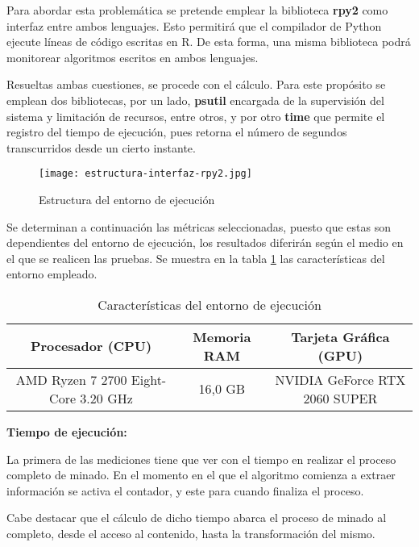 Para abordar esta problemática se pretende emplear la biblioteca \textbf{rpy2} \cite{rpy2} como interfaz 
entre ambos lenguajes. Esto permitirá que el compilador de Python ejecute líneas de código escritas en R. 
De esta forma, una misma biblioteca podrá monitorear algoritmos escritos en ambos lenguajes.

Resueltas ambas cuestiones, se procede con el cálculo. Para este propósito se emplean dos bibliotecas, por
un lado, \textbf{psutil} \cite{psutil} encargada de la supervisión del sistema y limitación de recursos, 
entre otros, y por otro \textbf{time} que permite el registro del tiempo de ejecución, pues retorna el 
número de segundos transcurridos desde un cierto instante.

\begin{figure}[tphb]
  \centering
  \texttt{[image: estructura-interfaz-rpy2.jpg]}
  \caption{Estructura del entorno de ejecución}
  \label{img:estructura del entorno de ejecucion}
\end{figure}

Se determinan a continuación las métricas seleccionadas, puesto que estas son dependientes del entorno de 
ejecución, los resultados diferirán según el medio en el que se realicen las pruebas. Se muestra en la
tabla \ref{tab:caracteristicas del entorno de ejecucion} las características del entorno empleado.

\begin{table}[h]
  \begin{center}
    \begin{tabular}{| c | c | c |} \hline 
     \textbf{Procesador (CPU)} & \textbf{Memoria RAM} & \textbf{Tarjeta Gráfica (GPU)} \\ \hline
     AMD Ryzen 7 2700 Eight-Core 3.20 GHz & 16,0 GB & NVIDIA GeForce RTX 2060 SUPER \\ \hline
    \end{tabular}
    \caption{Características del entorno de ejecución}
    \label{tab:caracteristicas del entorno de ejecucion}
  \end{center}
\end{table} 

\textbf{Tiempo de ejecución:}

La primera de las mediciones tiene que ver con el tiempo en realizar el proceso completo de minado. En el 
momento en el que el algoritmo comienza a extraer información se activa el contador, y este para cuando 
finaliza el proceso.

Cabe destacar que el cálculo de dicho tiempo abarca el proceso de minado al completo, desde el acceso al
contenido, hasta la transformación del mismo.

